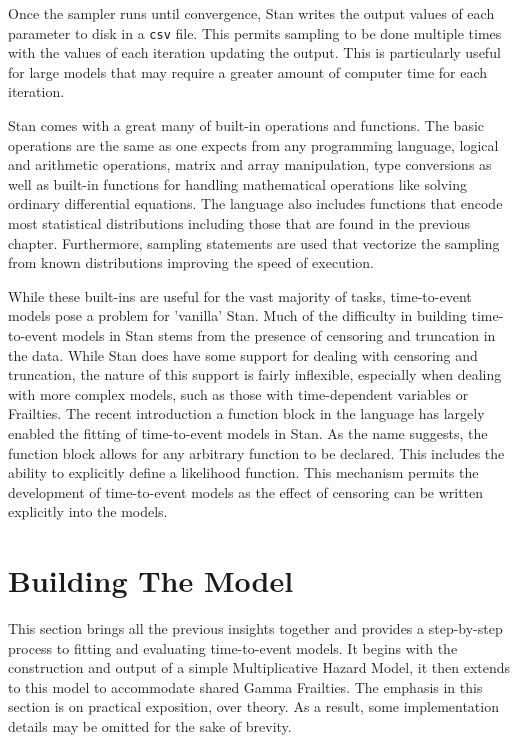 Once the sampler runs until convergence, Stan writes the output values of each parameter to disk in a \lstinline{csv} file. This permits sampling to be done multiple times with the values of each iteration updating the output. This is particularly useful for large models that may require a greater amount of computer time for each iteration.

Stan comes with a great many of built-in operations and functions. The basic operations are the same as one expects from any programming language, logical and arithmetic operations, matrix and array manipulation, type conversions as well as built-in functions for handling mathematical operations like solving ordinary differential equations. The language also includes functions that encode most statistical distributions including those that are found in the previous chapter. Furthermore, sampling statements are used that vectorize the sampling from known distributions improving the speed of execution. 

While these built-ins are useful for the vast majority of tasks, time-to-event models pose a problem for 'vanilla' Stan. Much of the difficulty in building time-to-event models in Stan stems from the presence of censoring and truncation in the data. While Stan does have some support for dealing with censoring and truncation, the nature of this support is fairly inflexible, especially when dealing with more complex models, such as those with time-dependent variables or Frailties. The recent introduction a function block in the language has largely enabled the fitting of time-to-event models in Stan. As the name suggests, the function block allows for any arbitrary function to be declared. This includes the ability to explicitly define a likelihood function. This mechanism permits the development of time-to-event models as the effect of censoring can be written explicitly into the models. 


\section*{Building The Model}


This section brings all the previous insights together and provides a step-by-step process to fitting and evaluating time-to-event models. It begins with the construction and output of a simple Multiplicative Hazard Model, it then extends to this model to accommodate shared Gamma Frailties. The emphasis in this section is on practical exposition, over theory. As a result, some implementation details may be omitted for the sake of brevity. 

